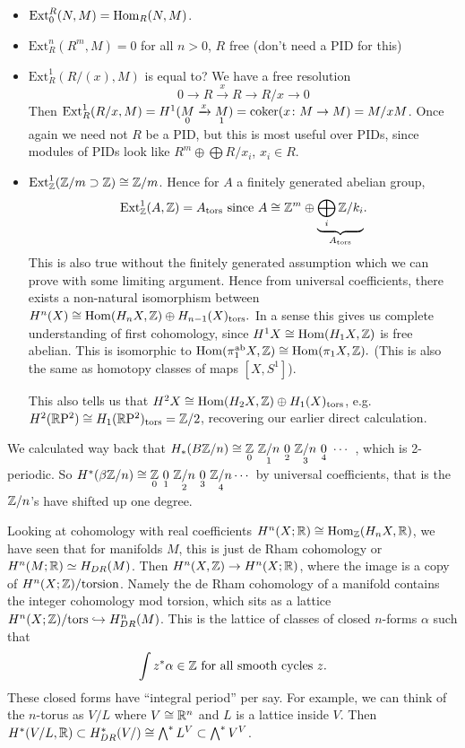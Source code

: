     \begin{itemize}
    \setlength\itemsep{-.2em}
        \item $\mathrm{Ext}_0^R(N,M)=\operatorname{Hom}_R(N,M)$.
        \item $\mathrm{Ext}^n _R(R^m,M)=0$ for all $n>0$, $R$ free (don't need a PID for this)
        \item $\mathrm{Ext}_R^1(R / (x),M)$ is equal to? We have a free resolution \[
       0 \to R \xrightarrow xR \to  R /x \to 0 
   \] Then $\mathrm{Ext}_R^1(R / x,M)=H^1(\underset{0}{M}  \xrightarrow x\underset{1}{M} )=\operatorname{coker}(x\colon M \to M)=M /xM$. Once again we need not $R$ be a PID, but this is most useful over PIDs, since modules of PIDs look like $R^m\oplus \bigoplus R / x_i $, $x_i  \in R$.
   \item $\operatorname{Ext}^1_{\mathbb{Z}}(\mathbb{Z} /m \supset \mathbb{Z}) \cong \mathbb{Z} /m$. Hence for $A$ a finitely generated abelian group, 
       \[
           \Ext_{\Z}^1(A,\Z)=A _{\mathrm{tors}} \ \text{since}\ A \cong \Z^m\oplus \underset{A _{\mathrm{tors}}}{\underbrace{\bigoplus _i  \Z /k_i}}  .
       \] 
       This is also true without the finitely generated assumption which we can prove with some limiting argument. Hence from universal coefficients, there exists a non-natural isomorphism between $H^n (X)\cong \operatorname{Hom}(H_n X,\mathbb{Z})\oplus H_{n-1}(X) _{\mathrm{tors}}.$ In a sense this gives us complete understanding of first cohomology, since $H^1X \cong \operatorname{Hom}(H_1X,\mathbb{Z})$ is free abelian. This is isomorphic to $\operatorname{Hom}(\pi_1 ^{\mathrm{ab}}X,\mathbb{Z}) \cong \operatorname{Hom}(\pi_1 X,\mathbb{Z})  .$ (This is also the same as homotopy classes of maps $[X,S^1 ]$).

       This also tells us that $H^2X \cong \operatorname{Hom}(H_2 X,\mathbb{Z})\oplus H_1(X) _{\mathrm{tors}}$, e.g. $H^2 (\mathbb{R} \mathrm P^2) \cong H_1(\mathbb{R} \mathrm P^2) _{\mathrm{tors}}= \mathbb{Z} /2$, recovering our earlier direct calculation.
    \end{itemize}
\begin{example}
    We calculated way back that $H_*(B \Z/n) \cong \underset{0}{\Z}\ \underset{1}{\Z/n}\ \underset{2}{0}\ \underset{3}{\Z/n}\ \underset{4}{0}\ \cdots $ , which is 2-periodic. So $H^* (\beta  \mathbb{Z}/n) \cong \underset{0}{\mathbb{Z}} \ \underset{1}{0}\ \underset{2}{\mathbb{Z}/n}\ \underset{3}{0} \ \underset{4}{\mathbb{Z}/n} \cdots  $ by universal coefficients, that is the $\mathbb{Z}/n$'s have shifted up one degree.
\end{example}
Looking at cohomology with real coefficients $H^n (X;\mathbb{R})\cong \operatorname{Hom}_{\mathbb{Z}}(H_n X,\mathbb{R})$, we have seen that for manifolds $M$, this is just de Rham cohomology or $H^n (M;\mathbb{R}) \simeq  H_{DR}(M)$. Then $H^n (X,\mathbb{Z}) \to H^n (X;\mathbb{R})$, where the image is a copy of $H^n  (X;\mathbb{Z}) / \text{torsion} $. Namely the de Rham cohomology of a manifold contains the integer cohomology mod torsion, which sits as a lattice $H^n (X;\mathbb{Z}) / \mathrm{tors} \hookrightarrow  H^n _{DR}(M)$. This is the lattice of classes of closed  $n$-forms $\alpha $ such that \[
\int z^* \alpha  \in \Z \ \text{for all smooth cycles} \ z.
\] These closed forms have ``integral period'' per say. For example, we can think of the $n$-torus as $V /L$ where $V \cong \mathbb{R}^n $ and $L$ is a lattice inside $V$. Then $H^*(V /L,\mathbb{R})\subset H_{DR}^*(V /) \cong \bigwedge ^*L^V \subset \bigwedge^* V^{V}$.
